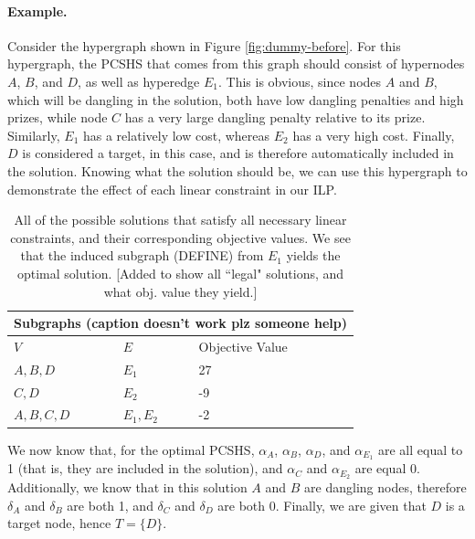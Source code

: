 \documentclass[12pt,twoside]{reedthesis}
\newcommand{\new}[2]{{\color{purple}#1 [#2]}}
\theoremstyle{definition}
\begin{document}
\paragraph{Example.}Consider the hypergraph shown in Figure \ref{fig:dummy-before}. For this hypergraph, the PCSHS that comes from this graph should consist of hypernodes $A$, $B$, and $D$, as well as hyperedge $E_1$. This is obvious, since nodes $A$ and $B$, which will be dangling in the solution, both have low dangling penalties and high prizes, while node $C$ has a very large dangling penalty relative to its prize. Similarly, $E_1$ has a relatively low cost, whereas $E_2$ has a very high cost. Finally, $D$ is considered a target, in this case, and is therefore automatically included in the solution. Knowing what the solution should be, we can use this hypergraph to demonstrate the effect of each linear constraint in our ILP.\par

\begin{table}[!h]
\begin{center}
  \label{tab:obj_values_dummy}
  \caption[Objective values of dummy hypergraph.]{\new{All of the possible solutions that satisfy all necessary linear constraints, and their corresponding objective values. We see that the induced subgraph (DEFINE) from $E_1$ yields the optimal solution.}{Added to show all ``legal" solutions, and what obj. value they yield.}}
\begin{tabular}{ |l|l|l| }%
  \hline%
  \multicolumn{3}{|c|}{Subgraphs (caption doesn't work plz someone help)} \\%
  \hline \hline
  $V$ & $E$ & Objective Value \\ \hline%
  $A,B,D$ & $E_1$ & 27 \\ \hline%
  $C,D$ & $E_2$ & -9 \\ \hline%
  $A,B,C,D$ & $E_1,E_2$ & -2 \\ \hline%
\end{tabular}%
\end{center}
\end{table}

We now know that, for the optimal PCSHS, $\alpha_A$, $\alpha_B$, $\alpha_D$, and $\alpha_{E_1}$ are all equal to 1 (that is, they are included in the solution), and $\alpha_C$ and $\alpha_{E_2}$ are equal 0. Additionally, we know that in this solution $A$ and $B$ are dangling nodes, therefore $\delta_A$ and $\delta_B$ are both 1, and $\delta_C$ and $\delta_D$ are both 0. Finally, we are given that $D$ is a target node, hence $T=\{D\}$.\par
\end{document}
